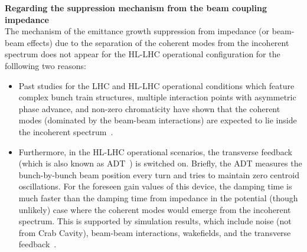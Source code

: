 



\textbf{Regarding the suppression mechanism from the beam coupling impedance}\\
The mechanism of the emittance growth suppression from impedance (or beam-beam effects) due to the separation of the coherent modes from the incoherent spectrum does not appear for the HL-LHC operational configuration for the folllowing two reasons:
\begin{itemize}
   \item Past studies for the LHC and HL-LHC operational conditions which feature complex bunch train structures, multiple interaction points with asymmetric phase advance, and non-zero chromaticity have shown that the coherent modes (dominated by the beam-beam interactions) are expected to lie inside the incoherent spectrum~\cite{Pieloni:1259906, Buffat:2712068}.
   \item Furthermore, in the HL-LHC operational scenarios, the transverse feedback (which is also known as ADT~\cite{lhc_adt_info_presentation}) is switched on. Briefly, the ADT measures the bunch-by-bunch beam position every turn and tries to maintain zero centroid oscillations. For the foreseen gain values of this device, the damping time is much faster than the damping time from impedance in the potential (though unlikely) case where the coherent modes would emerge from the incoherent spectrum. This is supported by simulation results, which include noise (not from Crab Cavity), beam-beam interactions, wakefields, and the transverse feedback~\cite{Buffat:2712068}.
\end{itemize}


